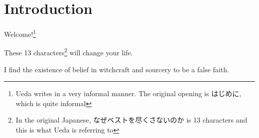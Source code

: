 
\chapter{Introduction}
Welcome!\footnote{Ueda writes in a very informal manner. The original opening is はじめに, which is quite informal}
\par These 13 characters\footnote {In the original Japanese, なぜベストを尽くさないのか is 13 characters and this is what Ueda is referring to} will change your life.
\par I find the existence of belief in witchcraft and sourcery to be a false faith.